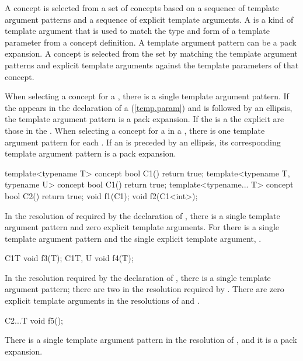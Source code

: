 \pnum
A concept is selected from a set of concepts based on a sequence
of template argument patterns and a sequence of explicit
template arguments. 
% 
A  is a kind of template argument 
that is used to match the type and form of a template parameter from a 
concept definition. A template argument pattern can be a pack expansion.
% 
A concept is selected from the set by matching the template
argument patterns and explicit template arguments against the template 
parameters of that concept.

\pnum
When selecting a concept for a ,
there is a single template argument pattern. 
% 
If the  appears in the declaration 
of a  (\ref{temp.param}) and is
followed by an ellipsis, the template argument pattern is a pack
expansion.
% 
If the 
is a  the explicit
 are those in
the .
% 
When selecting a concept for a  in a 
, there is one template argument pattern 
for each .
% 
If an  is
preceded by an ellipsis, its corresponding template argument pattern
is a pack expansion.
% 
\enterexample
\begin{codeblock}
template<typename T> concept bool C1() { return true; }
template<typename T, typename U> concept bool C1() { return true; }
template<typename... T> concept bool C2() { return true; }
% 
void f1(C1); 
void f2(C1<int>);
\end{codeblock}
% 
In the resolution of  required by the declaration of , 
there is a single template argument pattern and zero explicit template 
arguments.
% 
For  there is a single template argument pattern and the 
single explicit template argument, .
\begin{codeblock}
C1{T} void f3(T);
C1{T, U} void f4(T);
\end{codeblock}
In the resolution required by the declaration of , there
is a single template argument pattern; there are two in the resolution
required by . There are zero explicit template arguments
in the resolutions of  and .
\begin{codeblock}
C2{...T} void f5();
\end{codeblock}
There is a single template argument pattern in the resolution of
, and it is a pack expansion.
\exitexample

